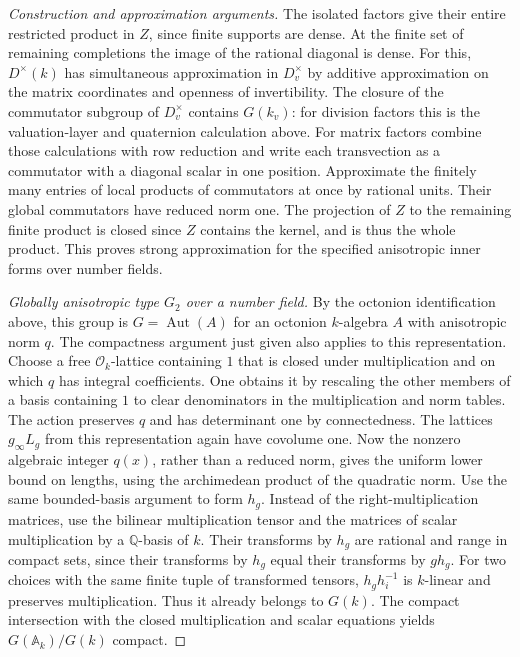 \documentclass[11pt,a4paper,openany,oneside]{book}
\theoremstyle{resultstyle}
\theoremstyle{definition}
\numberwithin{equation}{chapter}
\begin{document}
\begin{proof}[Construction and approximation arguments]
The isolated factors give their entire restricted product in
\(Z\), since finite supports are dense. At the finite set of
remaining completions the image of the rational diagonal is
dense. For this, \(D^\times(k)\) has simultaneous approximation
in \(D_v^\times\) by additive approximation on the matrix
coordinates and openness of invertibility. The closure of the
commutator subgroup of \(D_v^\times\) contains \(G(k_v)\):
for division factors this is the valuation-layer and quaternion
calculation above. For matrix factors combine those calculations
with row reduction and write each transvection as a commutator
with a diagonal scalar in one position. Approximate the
finitely many entries of local products of commutators at once
by rational units. Their global commutators have reduced norm
one. The projection of \(Z\) to the remaining finite product
is closed since \(Z\) contains the kernel, and is thus the
whole product. This proves strong approximation for the
specified anisotropic inner forms over number fields.

\medskip\noindent
\textit{Globally anisotropic type \(G_2\) over a number field.}
By the octonion identification above, this group is
\(G=\operatorname{Aut}(A)\) for an octonion \(k\)-algebra \(A\)
with anisotropic norm \(q\). The compactness argument just given
also applies to this representation. Choose a free
\(\mathcal O_k\)-lattice containing \(1\) that is closed under
multiplication and on which \(q\) has integral coefficients.
One obtains it by rescaling the other members of a basis
containing \(1\) to clear denominators in the multiplication
and norm tables. The action preserves \(q\) and has determinant
one by connectedness. The lattices \(g_\infty L_g\) from this
representation again have covolume one. Now the nonzero
algebraic integer \(q(x)\), rather than a reduced norm,
gives the uniform lower bound on lengths, using the
archimedean product of the quadratic norm. Use the same
bounded-basis argument to form \(h_g\). Instead of the
right-multiplication matrices, use the bilinear multiplication
tensor and the matrices of scalar multiplication by a
\(\mathbb Q\)-basis of \(k\). Their transforms by \(h_g\)
are rational and range in compact sets, since their transforms
by \(h_g\) equal their transforms by \(gh_g\).
For two choices with the same finite tuple of transformed
tensors, \(h_gh_i^{-1}\) is \(k\)-linear and preserves
multiplication. Thus it already belongs to \(G(k)\).
The compact intersection with the closed multiplication and
scalar equations yields \(G(\mathbb A_k)/G(k)\) compact.


\end{proof}
\end{document}
